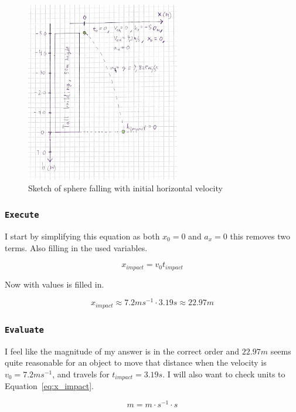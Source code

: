 \documentclass{article}
\let\oldsubsubsection\subsubsection
\renewcommand{\subsubsection}[1]{%
  \oldsubsubsection{\texttt{#1}}%
}
\begin{document}
\begin{figure}[h]
    \centering
    \includegraphics[width=0.6\textwidth]{Figures/Sketch2.jpg}
    \caption{Sketch of sphere falling with initial horizontal velocity}
    \label{fig:sketch_2}
\end{figure}

\subsubsection{Execute}
I start by simplifying this equation as both \(x_0 = 0\) and \(a_x = 0\) this removes two terms. Also filling in the used variables.

\begin{equation*}
    x_{impact} = v_0t_{impact}
\end{equation*}

Now with values is filled in.

\begin{equation}
    x_{impact} \approx 7.2ms^{-1} \cdot 3.19s \approx 22.97m
    \label{eq:x_impact}
\end{equation}

\clearpage
\subsubsection{Evaluate}
I feel like the magnitude of my answer is in the correct order and \(22.97m\) seems quite reasonable for an object to move that distance when the velocity is \(v_0 = 7.2ms^{-1}\), and travels for \(t_{impact} = 3.19s\). I will also want to check units to Equation~\ref{eq:x_impact}.

\begin{equation*}
    m = m \cdot s^{-1} \cdot s
\end{equation*}
\end{document}
